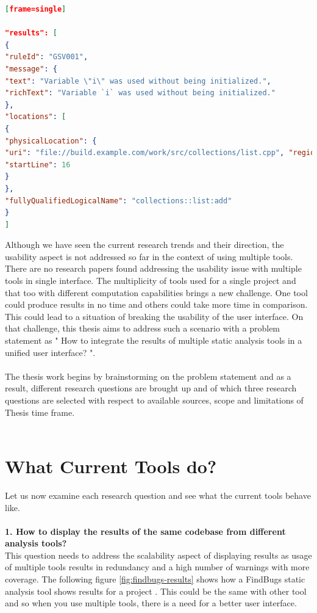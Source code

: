 \begin{lstlisting}[language=json,firstnumber=1][frame=single]

"results": [
{
"ruleId": "GSV001",
"message": {
"text": "Variable \"i\" was used without being initialized.",
"richText": "Variable `i` was used without being initialized." 
},
"locations": [
{
"physicalLocation": {
"uri": "file://build.example.com/work/src/collections/list.cpp", "region": {
"startLine": 16
}
},
"fullyQualifiedLogicalName": "collections::list:add"
}
]


\end{lstlisting}
\hfill \break
Although we have seen the current research trends and their direction, the usability aspect is not addressed so far in the context of using multiple tools. There are no research papers found addressing the usability issue with multiple tools in single interface. The multiplicity of tools used for a single project and that too with different computation capabilities brings a new challenge.  One tool could produce results in no time and others could take more time in comparison. This could lead to a situation of breaking the usability of the user interface. On that challenge, this thesis aims to address such a scenario with a problem statement as " How to integrate the results of multiple static analysis tools in a unified user interface? ".  \\ \\

The thesis work begins by brainstorming on the problem statement and as a result, different research questions are brought up and of which three research questions are selected with respect to available sources, scope and limitations of Thesis time frame. \\ \\

\section{What Current Tools do?}

Let us now examine each research question and see what the current tools behave like. \\ \\

\textbf{1. How to display the results of the same codebase from different analysis tools?}  \\

This question needs to address the scalability aspect of displaying results as usage of multiple tools results in redundancy and a high number of warnings with more coverage. The following figure \ref{fig:findbugs-results} shows how a FindBugs \cite{findbugs} static analysis tool shows results for a project \cite{findbugs-example}. This could be the same with other tool and so when you use multiple tools, there is a need for a better user interface.\\ \\

